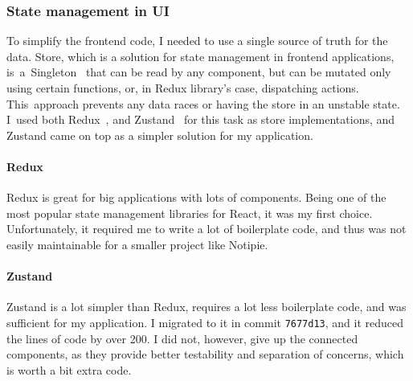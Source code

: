 \subsubsection{State management in UI}\label{sec:state-management-in-ui}

To simplify the frontend code,
I needed to use a single source of truth for the data.
Store,
which is a solution for state management
in frontend applications,
is~a~Singleton~\cite{gamma_design_1994}
that can be read by any component,
but can be mutated only using certain functions,
or, in Redux library's case, dispatching actions.
This~approach prevents any data races
or having the store in an unstable state.
I~used both Redux~\cite{gaeraon_redux_2022},
and Zustand~\cite{kato_zustand_2022} for this task
as store implementations,
and Zustand came on top as a simpler solution for my application.

\paragraph*{Redux}\label{sec:redux}

Redux is great for big applications with lots of components.
Being one of the most popular state management libraries for React,
it was my first choice.
Unfortunately,
it required me to write a lot of boilerplate code,
and thus was not easily maintainable
for a smaller project like Notipie.

\paragraph*{Zustand}\label{sec:zustand}

Zustand is a lot simpler than Redux,
requires a lot less boilerplate code,
and was sufficient for my application.
I migrated to it in commit
\texttt{7677d13},
and it reduced the lines of code by over 200.
I did not, however, give up the connected components,
as they provide better testability and separation of concerns,
which is worth a bit extra code.

